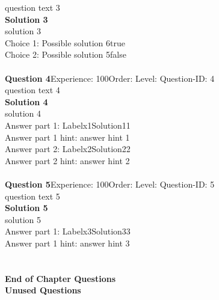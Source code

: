 \documentclass{article}
\begin{document}
question text 3\\[4pt]
\noindent\textbf{Solution 3}\\[2pt]
solution 3\\[4pt]
Choice 1: \hspace{20pt}Possible solution 6\hspace{20pt}true\\
Choice 2: \hspace{20pt}Possible solution 5\hspace{20pt}false\\
\\[4pt]
\noindent\textbf{Question 4}\hspace{20pt}Experience: 100\hspace{20pt}Order: \hspace{20pt}Level: \hspace{20pt}Question-ID: 4\\[2pt]
question text 4\\[4pt]
\noindent\textbf{Solution 4}\\[2pt]
solution 4\\[4pt]
Answer part 1: \hspace{10pt}Label\hspace{10pt}x1\hspace{10pt}Solution\hspace{10pt}11\\
Answer part 1 hint: \hspace{15pt}answer hint 1\\
Answer part 2: \hspace{10pt}Label\hspace{10pt}x2\hspace{10pt}Solution\hspace{10pt}22\\
Answer part 2 hint: \hspace{15pt}answer hint 2\\
\\[4pt]
\noindent\textbf{Question 5}\hspace{20pt}Experience: 100\hspace{20pt}Order: \hspace{20pt}Level: \hspace{20pt}Question-ID: 5\\[2pt]
question text 5\\[4pt]
\noindent\textbf{Solution 5}\\[2pt]
solution 5\\[4pt]
Answer part 1: \hspace{10pt}Label\hspace{10pt}x3\hspace{10pt}Solution\hspace{10pt}33\\
Answer part 1 hint: \hspace{15pt}answer hint 3\\
\\[4pt]
\\[2pt]
\noindent\large{\textbf{End of Chapter Questions}}\\[15pt]
\noindent\Huge{\textbf{Unused Questions}}\\[10pt]
\noindent\large{}\\
\end{document}
